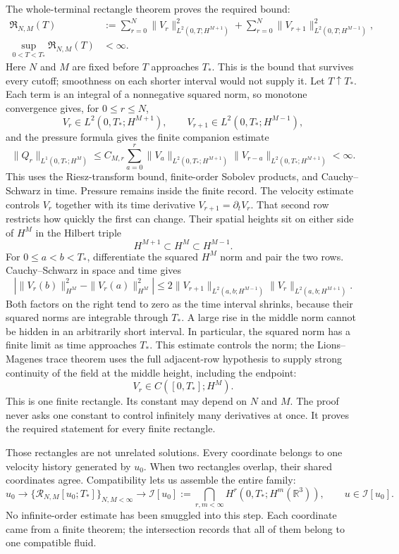 The whole-terminal rectangle theorem proves the required bound:
\[
\begin{aligned}
\mathfrak R_{N,M}(T)
&:=\sum_{r=0}^{N}
\|V_r\|_{L^2(0,T;H^{M+1})}^{2}+
\sum_{r=0}^{N}
\|V_{r+1}\|_{L^2(0,T;H^{M-1})}^{2},\\
\sup_{0<T<T_*}\mathfrak R_{N,M}(T)&<\infty.
\end{aligned}
\]
Here \(N\) and \(M\) are fixed before \(T\) approaches \(T_*\).  This is
the bound that survives every cutoff; smoothness on each shorter interval
would not supply it.  Let \(T\uparrow T_*\).  Each term is an integral of a
nonnegative squared norm, so monotone convergence gives, for
\(0\le r\le N\),
\[
V_r\in L^2(0,T_*;H^{M+1}),
\qquad
V_{r+1}\in L^2(0,T_*;H^{M-1}),
\]
and the pressure formula gives the finite companion estimate
\[
\|Q_r\|_{L^1(0,T_*;H^M)}
\leq C_{M,r}\sum_{a=0}^{r}
\|V_a\|_{L^2(0,T_*;H^{M+1})}
\|V_{r-a}\|_{L^2(0,T_*;H^{M+1})}<\infty.
\]
This uses the Riesz-transform bound, finite-order Sobolev products, and
Cauchy--Schwarz in time.  Pressure remains inside the finite record.
The velocity estimate controls \(V_r\) together with its time derivative
\(V_{r+1}=\partial_tV_r\).  That second row restricts how quickly the first can
change.  Their spatial heights sit on either side of \(H^M\) in the Hilbert
triple
\[
H^{M+1}\subset H^M\subset H^{M-1}.
\]
For \(0\le a<b<T_*\), differentiate the squared \(H^M\) norm and pair the
two rows.  Cauchy--Schwarz in space and time gives
\[
\left|
\|V_r(b)\|_{H^M}^2-\|V_r(a)\|_{H^M}^2
\right|
\leq
2\|V_{r+1}\|_{L^2(a,b;H^{M-1})}
 \|V_r\|_{L^2(a,b;H^{M+1})}.
\]
Both factors on the right tend to zero as the time interval shrinks, because
their squared norms are integrable through \(T_*\).  A large rise in the
middle norm cannot be hidden in an arbitrarily short interval.  In particular,
the squared norm has a finite limit as time approaches \(T_*\).
This estimate controls the norm; the Lions--Magenes trace theorem uses the
full adjacent-row hypothesis to supply strong continuity of the field at the
middle height, including the endpoint:
\[
V_r\in C([0,T_*];H^M).
\]
This is one finite rectangle.  Its constant may depend on \(N\) and \(M\).
The proof never asks one constant to control infinitely many derivatives at
once.  It proves the required statement for every finite rectangle.

Those rectangles are not unrelated solutions.  Every coordinate belongs to
one velocity history generated by \(u_0\).  When two rectangles overlap, their
shared coordinates agree.  Compatibility lets us assemble the entire family:
\[
u_0
\longrightarrow
\{\mathcal R_{N,M}[u_0;T_*]\}_{N,M<\infty}
\longrightarrow
\mathcal I[u_0]
:=\bigcap_{r,m<\infty}H^r(0,T_*;H^m(\mathbb R^3)),
\qquad
u\in\mathcal I[u_0].
\]
No infinite-order estimate has been smuggled into this step.  Each coordinate
came from a finite theorem; the intersection records that all of them belong
to one compatible fluid.

